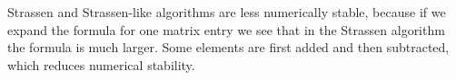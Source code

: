\documentclass[a4paper,11pt]{article}
\begin{document}
Strassen and Strassen-like algorithms are less numerically stable, because if we expand the formula for one matrix entry we see that in the Strassen algorithm the formula is much larger. Some elements are first added and then subtracted, which reduces numerical stability.








\end{document}
